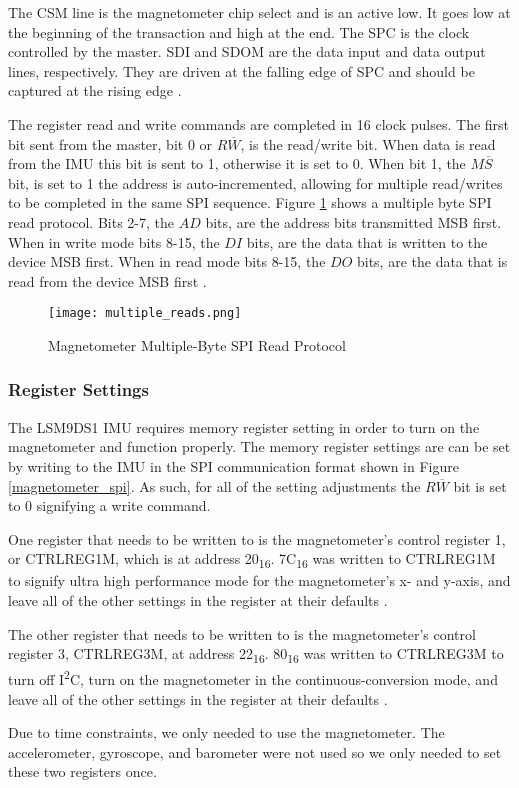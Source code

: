 The CS\textunderscore{}M line is the magnetometer chip select and is an active low. It goes low at the beginning of the transaction and high at the end. The SPC is the clock controlled by the master. SDI and SDO\textunderscore{}M are the data input and data output lines, respectively. They are driven at the falling edge of SPC and should be captured at the rising edge \cite{lsm9ds1}.
\par
The register read and write commands are completed in 16 clock pulses. The first bit sent from the master, bit 0 or $R\overline{W}$, is the read/write bit. When data is read from the IMU this bit is sent to 1, otherwise it is set to 0. When bit 1, the $M\overline{S}$ bit, is set to 1 the address is auto-incremented, allowing for multiple read/writes to be completed in the same SPI sequence. Figure \ref{multiple_reads} shows a multiple byte SPI read protocol. Bits 2-7, the $AD$ bits, are the address bits transmitted MSB first. When in write mode bits 8-15, the $DI$ bits, are the data that is written to the device MSB first. When in read mode bits 8-15, the $DO$ bits, are the data that is read from the device MSB first \cite{lsm9ds1}.

\begin{figure}[H]
	\centerline{\texttt{[image: multiple\_reads.png]}}
	\caption{Magnetometer Multiple-Byte SPI Read Protocol \cite{lsm9ds1}}
	\label{multiple_reads}
\end{figure}

\subsubsection{Register Settings} \label{imu_settings}
The LSM9DS1 IMU requires memory register setting in order to turn on the magnetometer and function properly. The memory register settings are can be set by writing to the IMU in the SPI communication format shown in Figure \ref{magnetometer_spi}. As such, for all of the setting adjustments the $R\overline{W}$ bit is set to 0 signifying a write command.
\par
One register that needs to be written to is the magnetometer's control register 1, or CTRL\textunderscore{}REG\textunderscore{}1\textunderscore{}M, which is at address 20\textsubscript{16}. 7C\textsubscript{16} was written to CTRL\textunderscore{}REG\textunderscore{}1\textunderscore{}M to signify ultra high performance mode for the magnetometer's x- and y-axis, and leave all of the other settings in the register at their defaults \cite{lsm9ds1}.
\par
The other register that needs to be written to is the magnetometer's control register 3, CTRL\textunderscore{}REG\textunderscore{}3\textunderscore{}M, at address 22\textsubscript{16}. 80\textsubscript{16} was written to CTRL\textunderscore{}REG\textunderscore{}3\textunderscore{}M to turn off I\textsuperscript{2}C, turn on the magnetometer in the continuous-conversion mode, and leave all of the other settings in the register at their defaults \cite{lsm9ds1}.
\par
Due to time constraints, we only needed to use the magnetometer. The accelerometer, gyroscope, and barometer were not used so we only needed to set these two registers once.

